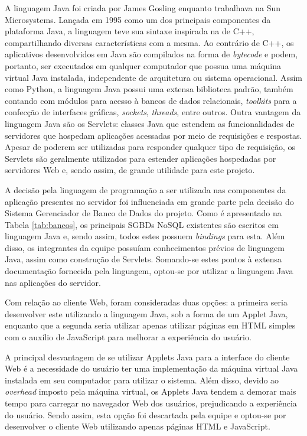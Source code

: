 A linguagem Java foi criada por James Gosling enquanto trabalhava na Sun Microsystems.
Lançada em 1995 como um dos principais componentes da plataforma Java, a linguagem teve sua sintaxe inspirada na de C++, compartilhando diversas características com a mesma.
Ao contrário de C++, os aplicativos desenvolvidos em Java são compilados na forma de \emph{bytecode} e podem, portanto, ser executados em qualquer computador que possua uma máquina virtual Java instalada, independente de arquitetura ou sistema operacional.
Assim como Python, a linguagem Java possui uma extensa biblioteca padrão, também contando com módulos para acesso à bancos de dados relacionais, \emph{toolkits} para a confecção de interfaces gráficas, \emph{sockets}, \emph{threads}, entre outros.
Outra vantagem da linguagem Java são os Servlets: classes Java que estendem as funcionalidades de servidores que hospedam aplicações acessadas por meio de requisições e respostas.
Apesar de poderem ser utilizadas para responder qualquer tipo de requisição, os Servlets são geralmente utilizados para estender aplicações hospedadas por servidores Web e, sendo assim, de grande utilidade para este projeto.

A decisão pela linguagem de programação a ser utilizada nas componentes da aplicação presentes no servidor foi influenciada em grande parte pela decisão do Sistema Gerenciador de Banco de Dados do projeto.
Como é apresentado na Tabela \ref{tab:bancos}, os principais SGBDs NoSQL existentes são escritos em linguagem Java e, sendo assim, todos estes possuem \emph{bindings} para esta.
Além disso, os integrantes da equipe possuíam conhecimentos prévios de linguagem Java, assim como construção de Servlets.
Somando-se estes pontos à extensa documentação fornecida pela linguagem, optou-se por utilizar a linguagem Java nas aplicações do servidor.

Com relação ao cliente Web, foram consideradas duas opções: a primeira seria desenvolver este utilizando a linguagem Java, sob a forma de um Applet Java, enquanto que a segunda seria utilizar apenas utilizar páginas em HTML simples com o auxílio de JavaScript para melhorar a experiência do usuário.

A principal desvantagem de se utilizar Applets Java para a interface do cliente Web é a necessidade do usuário ter uma implementação da máquina virtual Java instalada em seu computador para utilizar o sistema.
Além disso, devido ao \emph{overhead} imposto pela máquina virtual, os Applets Java tendem a demorar mais tempo para carregar no navegador Web dos usuários, prejudicando a experiência do usuário.
Sendo assim, esta opção foi descartada pela equipe e optou-se por desenvolver o cliente Web utilizando apenas páginas HTML e JavaScript.

